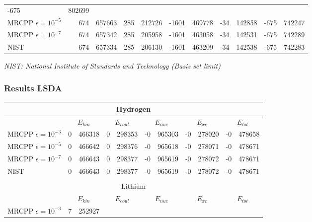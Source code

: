 \documentclass[slides]{beamer}
\begin{document}
\begin{frame}
\begin{table}
\begin{tabular}{|l|r@{.}l|r@{.}l|r@{.}l|r@{.}l|r@{.}l|}
			 -675&802699\\
			MRCPP $\epsilon=10^{-5}$&
			  674&657663&
			  285&212726&
			-1601&469778&
			  -34&142858&
			 -675&742247\\
			MRCPP $\epsilon=10^{-7}$&
			  674&657342&
			  285&205958&
			-1601&463058&
			  -34&142531&
			 -675&742289\\
			\hline
			NIST&
			  674&657334&
			  285&206130&
			-1601&463209&
			  -34&142538&
			 -675&742283\\
			\hline
		\end{tabular}
	\end{table}
	\tiny
	\it{NIST: National Institute of Standards and Technology (Basis set limit)}\\
\end{frame}

\begin{frame}
	\frametitle{Results LSDA}
	\begin{table}
		\tiny
		\centering
		\begin{tabular}{|l|r@{.}l|r@{.}l|r@{.}l|r@{.}l|r@{.}l|}
			\multicolumn{11}{c}{Hydrogen}\\
			\hline
			&
			\multicolumn{2}{c|}{$E_{kin}$}&
			\multicolumn{2}{c|}{$E_{coul}$}&
			\multicolumn{2}{c|}{$E_{nuc}$}&
			\multicolumn{2}{c|}{$E_{xc}$}&
			\multicolumn{2}{c|}{$E_{tot}$}\\
			\hline
			MRCPP $\epsilon=10^{-3}$&
			  0&466318&
			  0&298353&
			 -0&965303&
			 -0&278020&
			 -0&478658\\
			MRCPP $\epsilon=10^{-5}$&
			  0&466642&
			  0&298376&
			 -0&965618&
			 -0&278071&
			 -0&478671\\
			MRCPP $\epsilon=10^{-7}$&
			  0&466643&
			  0&298377&
			 -0&965619&
			 -0&278072&
			 -0&478671\\
			\hline
			NIST&
			  0&466643&
			  0&298377&
			 -0&965619&
			 -0&278072&
			 -0&478671\\
			\hline
			\multicolumn{11}{c}{}\\
			\multicolumn{11}{c}{Lithium}\\
			\hline
			&
			\multicolumn{2}{c|}{$E_{kin}$}&
			\multicolumn{2}{c|}{$E_{coul}$}&
			\multicolumn{2}{c|}{$E_{nuc}$}&
			\multicolumn{2}{c|}{$E_{xc}$}&
			\multicolumn{2}{c|}{$E_{tot}$}\\
			\hline
			MRCPP $\epsilon=10^{-3}$&
			  7&252927&

\end{tabular}
\end{table}
\end{frame}
\end{document}
